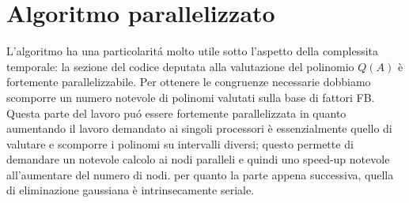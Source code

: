 \section{Algoritmo parallelizzato}
\label{sec:parallelo}

L'algoritmo ha una particolarit\'{a} molto utile sotto l'aspetto della complessita temporale:
la sezione del codice deputata alla valutazione del polinomio $Q(A)$ è fortemente parallelizzabile.
Per ottenere le congruenze necessarie dobbiamo scomporre un numero notevole di polinomi valutati 
sulla base di fattori FB.
Questa parte del lavoro pu\'{o} essere fortemente parallelizzata in quanto aumentando 
il lavoro demandato ai singoli processori è essenzialmente quello di valutare e scomporre i polinomi
su intervalli diversi; questo permette di demandare un notevole calcolo ai nodi paralleli e quindi uno speed-up notevole all'aumentare del numero di nodi.
per quanto la parte appena successiva, quella di eliminazione gaussiana è intrinsecamente seriale.



